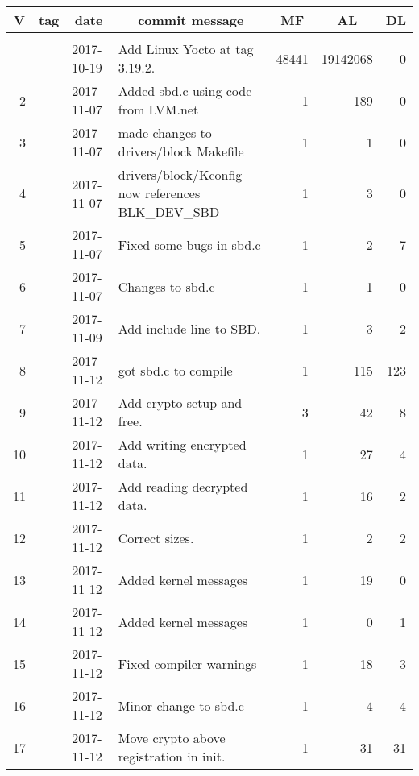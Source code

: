 \documentclass[letterpaper,10pt,titlepage,draftclsnofoot,onecolumn]{article}
\begin{document}
\bigskip

\begin{longtable}{|rlllrrr|}
\hline \multicolumn{1}{|c}{\textbf{V}} & \multicolumn{1}{c}{\textbf{tag}}
& \multicolumn{1}{c}{\textbf{date}}
& \multicolumn{1}{c}{\textbf{commit message}} & \multicolumn{1}{c}{\textbf{MF}}
& \multicolumn{1}{c}{\textbf{AL}} & \multicolumn{1}{c|}{\textbf{DL}} \\ \hline
\endhead

\hline \multicolumn{7}{|r|}{} \\ \hline
\endfoot

\hline%
\endlastfoot

\hline 1 &  & 2017-10-19 & Add Linux Yocto at tag 3.19.2. & 48441 & 19142068 & 0 \\
\hline 2 &  & 2017-11-07 & Added sbd.c using code from LVM.net & 1 & 189 & 0 \\
\hline 3 &  & 2017-11-07 & made changes to drivers/block Makefile & 1 & 1 & 0 \\
\hline 4 &  & 2017-11-07 & drivers/block/Kconfig now references BLK\_DEV\_SBD & 1 & 3 & 0 \\
\hline 5 &  & 2017-11-07 & Fixed some bugs in sbd.c & 1 & 2 & 7 \\
\hline 6 &  & 2017-11-07 & Changes to sbd.c & 1 & 1 & 0 \\
\hline 7 &  & 2017-11-09 & Add include line to SBD. & 1 & 3 & 2 \\
\hline 8 &  & 2017-11-12 & got sbd.c to compile & 1 & 115 & 123 \\
\hline 9 &  & 2017-11-12 & Add crypto setup and free. & 3 & 42 & 8 \\
\hline 10 &  & 2017-11-12 & Add writing encrypted data. & 1 & 27 & 4 \\
\hline 11 &  & 2017-11-12 & Add reading decrypted data. & 1 & 16 & 2 \\
\hline 12 &  & 2017-11-12 & Correct sizes. & 1 & 2 & 2 \\
\hline 13 &  & 2017-11-12 & Added kernel messages & 1 & 19 & 0 \\
\hline 14 &  & 2017-11-12 & Added kernel messages & 1 & 0 & 1 \\
\hline 15 &  & 2017-11-12 & Fixed compiler warnings & 1 & 18 & 3 \\
\hline 16 &  & 2017-11-12 & Minor change to sbd.c & 1 & 4 & 4 \\
\hline 17 &  & 2017-11-12 & Move crypto above registration in init. & 1 & 31 & 31 \\

\end{longtable}
\end{document}
